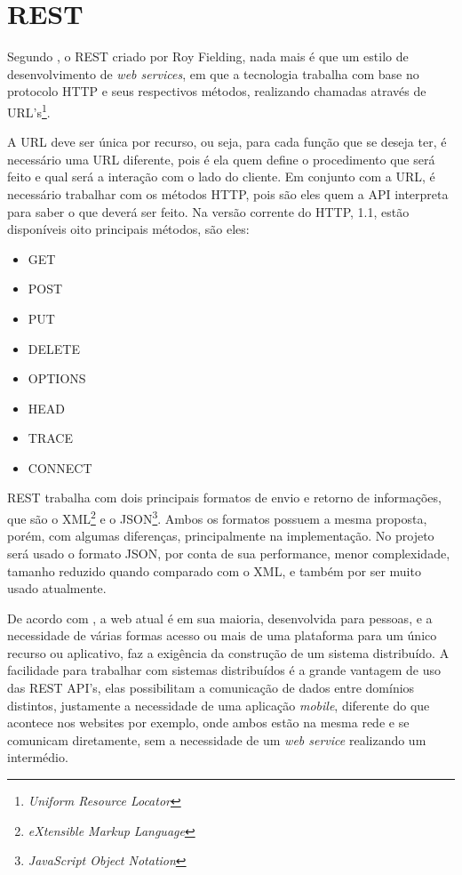 \section{REST}
	\par Segundo , o REST criado por Roy Fielding, nada mais é que um estilo de desenvolvimento de \textit{web services}, em que a tecnologia trabalha com base no protocolo HTTP e seus respectivos métodos, realizando chamadas através de URL's\footnote{\textit{Uniform Resource Locator}}. 
	\par A URL deve ser única por recurso, ou seja, para cada função que se deseja ter, é necessário uma URL diferente, pois é ela quem define o procedimento que será feito e qual será a interação com o lado do cliente. Em conjunto com a URL, é necessário trabalhar com os métodos HTTP, pois são eles quem a API interpreta para saber o que deverá ser feito. Na versão corrente do HTTP, 1.1, estão disponíveis oito principais métodos, são eles:
	\begin{itemize}
	 	\item GET
	 	\item POST
	 	\item PUT
	 	\item DELETE
	 	\item OPTIONS
	 	\item HEAD
	 	\item TRACE
	   	\item CONNECT
	\end{itemize}
	\par REST trabalha com dois principais formatos de envio e retorno de informações, que são o XML\footnote{\textit{eXtensible Markup Language}} e o JSON\footnote{\textit{JavaScript Object Notation}}. Ambos os formatos possuem a mesma proposta, porém, com algumas diferenças, principalmente na implementação. No projeto será usado o formato JSON, por conta de sua performance, menor complexidade, tamanho reduzido quando comparado com o XML, e também por ser muito usado atualmente.
	\par De acordo com , a web atual é em sua maioria, desenvolvida para pessoas, e a necessidade de várias formas acesso ou mais de uma plataforma para um único recurso ou aplicativo, faz a exigência da construção de um sistema distribuído. A facilidade para trabalhar com sistemas distribuídos é a grande vantagem de uso das REST API's, elas possibilitam a comunicação de dados entre domínios distintos, justamente a necessidade de uma aplicação \textit{mobile}, diferente do que acontece nos websites por exemplo, onde ambos estão na mesma rede e se comunicam diretamente, sem a necessidade de um \textit{web service} realizando um intermédio.

